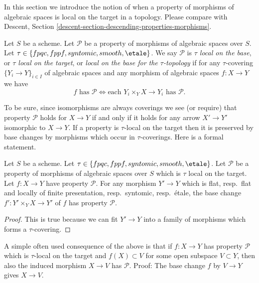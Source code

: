 \noindent
In this section we introduce the notion of when a property of morphisms of
algebraic spaces is local on the target in a topology. Please compare with
Descent, Section \ref{descent-section-descending-properties-morphisms}.

\begin{definition}
\label{definition-property-morphisms-local}
Let $S$ be a scheme.
Let $\mathcal{P}$ be a property of morphisms of algebraic spaces over $S$.
Let $\tau \in \{fpqc, fppf, syntomic, smooth, \etale\}$.
We say $\mathcal{P}$ is {\it $\tau$ local on the base}, or
{\it $\tau$ local on the target}, or
{\it local on the base for the $\tau$-topology} if for any
$\tau$-covering $\{Y_i \to Y\}_{i \in I}$ of algebraic spaces
and any morphism of algebraic spaces $f : X \to Y$ we
have
$$
f \text{ has }\mathcal{P}
\Leftrightarrow
\text{each }Y_i \times_Y X \to Y_i\text{ has }\mathcal{P}.
$$
\end{definition}

\noindent
To be sure, since isomorphisms are always coverings
we see (or require) that property $\mathcal{P}$ holds for $X \to Y$
if and only if it holds for any arrow $X' \to Y'$ isomorphic to $X \to Y$.
If a property is $\tau$-local on the target then it is preserved
by base changes by morphisms which occur in $\tau$-coverings. Here
is a formal statement.

\begin{lemma}
\label{lemma-pullback-property-local-target}
Let $S$ be a scheme.
Let $\tau \in \{fpqc, fppf, syntomic, smooth, \etale\}$.
Let $\mathcal{P}$ be a property of morphisms of algebraic spaces over $S$
which is $\tau$ local on the target. Let $f : X \to Y$ have property
$\mathcal{P}$. For any morphism $Y' \to Y$ which is
flat, resp.\ flat and locally of finite presentation, resp.\ syntomic,
resp.\ \'etale, the base change
$f' : Y' \times_Y X \to Y'$ of $f$ has property $\mathcal{P}$.
\end{lemma}

\begin{proof}
This is true because we can fit $Y' \to Y$ into a family of
morphisms which forms a $\tau$-covering.
\end{proof}

\noindent
A simple often used consequence of the above is that if
$f : X \to Y$ has property $\mathcal{P}$ which is $\tau$-local
on the target and $f(X) \subset V$
for some open subspace $V \subset Y$, then also the induced
morphism $X \to V$ has $\mathcal{P}$. Proof: The base change
$f$ by $V \to Y$ gives $X \to V$.

